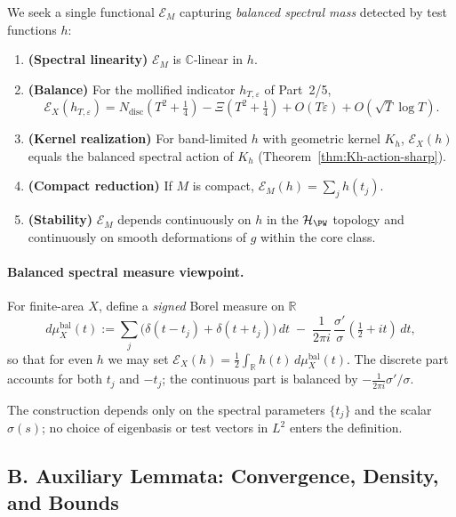 We seek a single functional $\mathcal E_M$ capturing \emph{balanced spectral mass} detected by test functions $h$:
\begin{enumerate}[label=(A\arabic*)]
  \item \textbf{(Spectral linearity)} $\mathcal E_M$ is $\mathbb C$-linear in $h$.
  \item \textbf{(Balance)} For the mollified indicator $h_{T,\varepsilon}$ of Part~2/5,
  \[
     \mathcal E_X(h_{T,\varepsilon})
     = N_{\mathrm{disc}}(T^2+\tfrac14)-\Xi(T^2+\tfrac14) + O(T\varepsilon)+O(\sqrt{T}\log T).
  \]
  \item \textbf{(Kernel realization)} For band-limited $h$ with geometric kernel $K_h$, $\mathcal E_X(h)$ equals the balanced spectral action of $K_h$ (Theorem~\ref{thm:Kh-action-sharp}).
  \item \textbf{(Compact reduction)} If $M$ is compact, $\mathcal E_M(h)=\sum_j h(t_j)$.
  \item \textbf{(Stability)} $\mathcal E_M$ depends continuously on $h$ in the $\mathcal H_{\PW}$ topology and continuously on smooth deformations of $g$ within the core class.
\end{enumerate}

\paragraph{Balanced spectral measure viewpoint.}
For finite-area $X$, define a \emph{signed} Borel measure on $\mathbb R$
\begin{equation}
\label{eq:balanced-measure}
  d\mu_X^{\mathrm{bal}}(t)
  := \sum_j \big(\delta(t-t_j)+\delta(t+t_j)\big)\,dt
     \;-\; \frac{1}{2\pi i}\,\frac{\sigma'}{\sigma}\!\left(\tfrac12+it\right)\,dt,
\end{equation}
so that for even $h$ we may set $\mathcal E_X(h)=\frac12\int_{\mathbb R} h(t)\,d\mu_X^{\mathrm{bal}}(t)$. The discrete part accounts for both $t_j$ and $-t_j$; the continuous part is balanced by $-\frac{1}{2\pi i}\sigma'/\sigma$.

\begin{remark}
\label{rem:no-vectors}
The construction depends only on the spectral parameters $\{t_j\}$ and the scalar $\sigma(s)$; no choice of eigenbasis or test vectors in $L^2$ enters the definition.
\end{remark}


\subsection*{B. Auxiliary Lemmata: Convergence, Density, and Bounds}
\label{subsec:aux}

